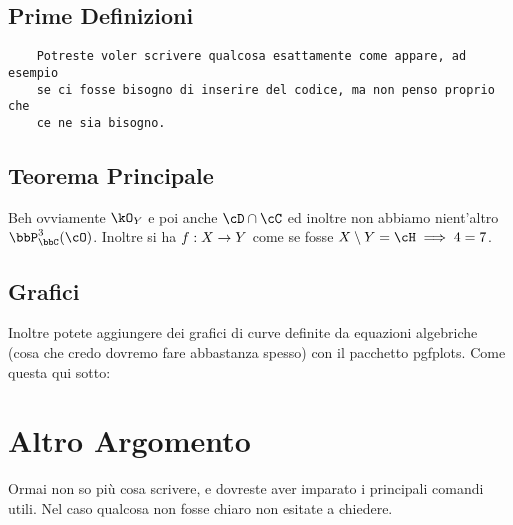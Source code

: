 \subsection{Prime Definizioni}
\begin{Verbatim}
    Potreste voler scrivere qualcosa esattamente come appare, ad esempio
    se ci fosse bisogno di inserire del codice, ma non penso proprio che
    ce ne sia bisogno.
\end{Verbatim}

\subsection{Teorema Principale}
Beh ovviamente $\kO_{Y}$ e poi anche $\cD \cap \cC$ ed inoltre non
abbiamo nient'altro $\bbP_\bbC^3 (\cO)$. Inoltre si ha $f: X \rightarrow Y$
come se fosse $X \setminus Y = \cH \implies 4 = 7$.

\subsection{Grafici}
Inoltre potete aggiungere dei grafici di curve definite da equazioni
algebriche (cosa che credo dovremo fare abbastanza spesso) con il
pacchetto pgfplots. Come questa qui sotto:



\section{Altro Argomento}
Ormai non so più cosa scrivere, e dovreste aver imparato i principali comandi
utili. Nel caso qualcosa non fosse chiaro non esitate a chiedere.


